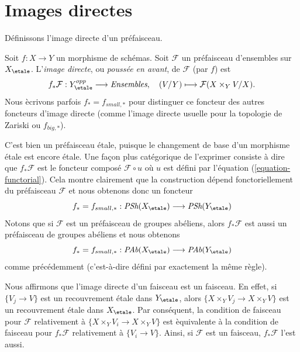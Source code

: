 \section{Images directes}
\label{section-direct-image}

\noindent
D\'efinissons l'image directe d'un pr\'efaisceau.

\begin{definition}
\label{definition-direct-image-presheaf}
Soit $f: X\to Y$ un morphisme de sch\'emas.
Soit $\mathcal{F} $ un pr\'efaisceau d'ensembles sur $X_\etale$.
L'{\it image directe}, ou {\it pouss\'ee en avant}, de $\mathcal{F}$
(par $f$) est
$$
f_*\mathcal{F} : Y_\etale^{opp} \longrightarrow \textit{Ensembles}, \quad
(V/Y) \longmapsto \mathcal{F}(X \times_Y V/X).
$$
Nous \`ecrivons parfois $f_* = f_{small, *}$ pour distinguer ce foncteur des autres
foncteurs d'image directe (comme l'image directe usuelle pour la topologie de Zariski ou $f_{big, *}$).
\end{definition}

\noindent
C'est bien un pr\'efaisceau \'etale, puisque le changement de base d'un morphisme
\'etale est encore \'etale. Une fa\c{c}on plus cat\'egorique de l'exprimer consiste \`a dire que
$f_*\mathcal{F}$ est le foncteur compos\'e $\mathcal{F} \circ u$
o\`u $u$ est d\'efini par l'\'equation (\ref{equation-functorial}). Cela montre
clairement que la construction d\'epend fonctoriellement du pr\'efaisceau
$\mathcal{F}$ et nous obtenons donc un foncteur
$$
f_* = f_{small, *} :
\textit{PSh}(X_\etale)
\longrightarrow
\textit{PSh}(Y_\etale)
$$
Notons que si $\mathcal{F}$ est un pr\'efaisceau de groupes ab\'eliens, alors
$f_*\mathcal{F}$ est aussi un pr\'efaisceau de groupes ab\'eliens et nous obtenons
$$
f_* = f_{small, *} :
\textit{PAb}(X_\etale)
\longrightarrow
\textit{PAb}(Y_\etale)
$$
comme pr\'ec\'edemment (c'est-\`a-dire d\'efini par exactement la m\^eme r\`egle).

\begin{remark}
\label{remark-direct-image-sheaf}
Nous affirmons que l'image directe d'un faisceau est un faisceau.
En effet, si $\{V_j \to V\}$ est un recouvrement \'etale dans $Y_\etale$,
alors $\{X \times_Y V_j \to X \times_Y V\}$ est un recouvrement \'etale dans
$X_\etale$. Par cons\'equent, la condition de faisceau pour $\mathcal{F}$ relativement
\`a $\{X \times_Y V_i \to X \times_Y V\}$
est \`equivalente \`a la condition de faisceau pour $f_*\mathcal{F}$ relativement \`a
$\{V_i \to V\}$. Ainsi, si $\mathcal{F}$ est un faisceau,
$f_*\mathcal{F}$ l'est aussi.
\end{remark}

